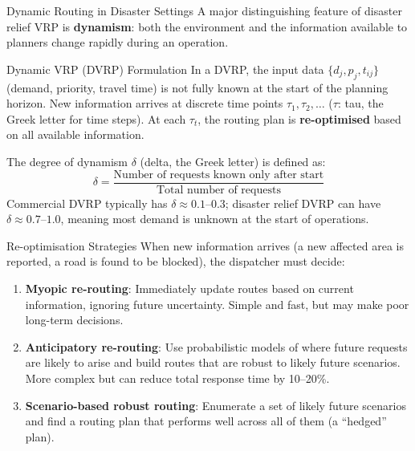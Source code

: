 \documentclass[aspectratio=169,10pt]{beamer}
\begin{document}
\begin{frame}[allowframebreaks]{Dynamic Routing in Disaster Settings}
  A major distinguishing feature of disaster relief VRP is
  \textbf{dynamism}: both the environment and the information
  available to planners change rapidly during an operation.

  \medskip
  \begin{block}{Dynamic VRP (DVRP) Formulation}
    In a DVRP, the input data $\{d_j, p_j, t_{ij}\}$ (demand,
    priority, travel time) is not fully known at the start of the
    planning horizon.
    New information arrives at discrete time points $\tau_1, \tau_2, \ldots$
    ($\tau$: tau, the Greek letter for time steps).
    At each $\tau_t$, the routing plan is \textbf{re-optimised} based
    on all available information.

    The degree of dynamism $\delta$ (delta, the Greek letter) is defined as:
    \[
      \delta = \frac{\text{Number of requests known only after start}}
                    {\text{Total number of requests}}
    \]
    Commercial DVRP typically has $\delta \approx 0.1$--$0.3$;
    disaster relief DVRP can have $\delta \approx 0.7$--$1.0$,
    meaning most demand is unknown at the start of operations.
  \end{block}

  \framebreak

  \begin{block}{Re-optimisation Strategies}
    When new information arrives (a new affected area is reported,
    a road is found to be blocked), the dispatcher must decide:
    \begin{enumerate}
      \item \textbf{Myopic re-routing}: Immediately update routes
            based on current information, ignoring future uncertainty.
            Simple and fast, but may make poor long-term decisions.
      \item \textbf{Anticipatory re-routing}: Use probabilistic models
            of where future requests are likely to arise and build
            routes that are robust to likely future scenarios.
            More complex but can reduce total response time by 10--20\%.
      \item \textbf{Scenario-based robust routing}: Enumerate a set of
            likely future scenarios and find a routing plan that
            performs well across all of them (a ``hedged'' plan).
    \end{enumerate}
  \end{block}


\end{frame}
\end{document}
